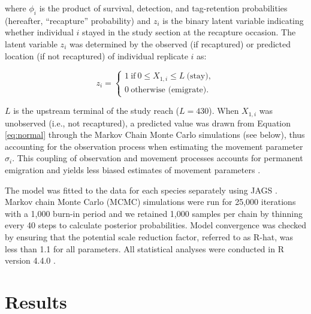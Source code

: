 \documentclass[11pt, class=article, crop=false]{standalone}
\begin{document}
where $\phi_i$ is the product of survival, detection, and tag-retention probabilities (hereafter, ``recapture'' probability) and $z_i$ is the binary latent variable indicating whether individual $i$ stayed in the study section at the recapture occasion.
The latent variable $z_i$ was determined by the observed (if recaptured) or predicted location (if not recaptured) of individual replicate $i$ as: 

\begin{equation}
    z_i =
    \begin{cases}
        1~\text{if}~0 \le X_{1,i} \le L~\text{(stay)},\\
        0~\text{otherwise (emigrate)}.
    \end{cases}
\end{equation}

$L$ is the upstream terminal of the study reach ($L = 430$). When $X_{1,i}$ was unobserved (i.e., not recaptured), a predicted value was drawn from Equation \ref{eq:normal} through the Markov Chain Monte Carlo simulations (see below), thus accounting for the observation process when estimating the movement parameter $\sigma_i$.
This coupling of observation and movement processes accounts for permanent emigration and yields less biased estimates of movement parameters \citep{teruiModelingDispersalUsing2020}.

The model was fitted to the data for each species separately using JAGS \citep{JAGSJustAnother}. Markov chain Monte Carlo (MCMC) simulations were run for 25,000 iterations with a 1,000 burn-in period and we retained 1,000 samples per chain by thinning every 40 steps to calculate posterior probabilities. Model convergence was checked by ensuring that the potential scale reduction factor, referred to as R-hat, was less than 1.1 for all parameters. All statistical analyses were conducted in R version 4.4.0 \citep{CoreTeam2020}.

\section{Results}
\end{document}
